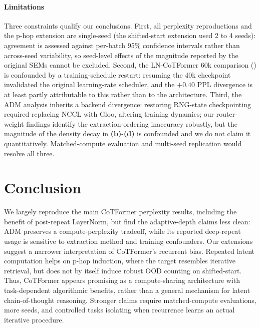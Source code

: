 \documentclass[10pt]{article}
\begin{document}
\paragraph{Limitations} Three constraints qualify our conclusions. First, all perplexity reproductions and the p-hop extension are single-seed (the shifted-start extension used 2 to 4 seeds): agreement is assessed against per-batch 95\% confidence intervals rather than across-seed variability, so seed-level effects of the magnitude reported by the original SEMs cannot be excluded. Second, the LN-CoTFormer 60k comparison () is confounded by a training-schedule restart: resuming the 40k checkpoint invalidated the original learning-rate scheduler, and the $+0.40$ PPL divergence is at least partly attributable to this rather than to the architecture. Third, the ADM analysis inherits a backend divergence: restoring RNG-state checkpointing required replacing NCCL with Gloo, altering training dynamics; our router-weight findings identify the extraction-ordering inaccuracy robustly, but the magnitude of the density decay in \textbf{(b)}-\textbf{(d)} is confounded and we do not claim it quantitatively. Matched-compute evaluation and multi-seed replication would resolve all three.

\section{Conclusion}
We largely reproduce the main CoTFormer perplexity results, including the benefit of post-repeat LayerNorm, but find the adaptive-depth claims less clean: ADM preserves a compute-perplexity tradeoff, while its reported deep-repeat usage is sensitive to extraction method and training confounders. Our extensions suggest a narrower interpretation of CoTFormer’s recurrent bias. Repeated latent computation helps on p-hop induction, where the target resembles iterative retrieval, but does not by itself induce robust OOD counting on shifted-start. Thus, CoTFormer appears promising as a compute-sharing architecture with task-dependent algorithmic benefits, rather than a general mechanism for latent chain-of-thought reasoning. Stronger claims require matched-compute evaluations, more seeds, and controlled tasks isolating when recurrence learns an actual iterative procedure.
\clearpage


\end{document}
